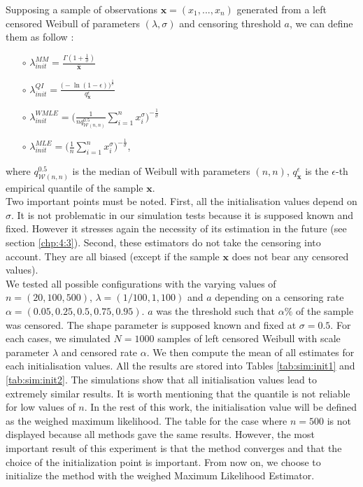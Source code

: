 \begin{appendices}
Supposing a sample of observations $\bm x = (x_1,...,x_n)$ generated from a left censored Weibull of parameters $(\lambda,\sigma)$ and censoring threshold $a$, we can define them as follow : 
    \begin{itemize}
        \item[$\circ$] $\lambda_{init}^{MM} =\frac{\Gamma(1+\frac{1}{\sigma})}{\bar{\bm x}}$ 
        \item[$\circ$] $\lambda_{init}^{QI} = \frac{\bigg(-\ln(1-\epsilon)\bigg)^{\frac{1}{\sigma}}}{q_{\bm x}^\epsilon}$
        \item[$\circ$] $\lambda_{init}^{WMLE} = \bigg(\frac{1}{nq^{0.5}_{\mathcal{W}(n,n)}}\sum_{i = 1}^nx_i^\sigma \bigg)^{-\frac{1}{\sigma}}$
        \item[$\circ$] $\lambda_{init}^{MLE} = \bigg(\frac{1}{n}\sum_{i = 1}^nx_i^\sigma \bigg)^{-\frac{1}{\sigma}}$, 
    \end{itemize}
    where $q^{0.5}_{\mathcal{W}(n,n)}$ is the median of Weibull with parameters $(n,n)$, $q_{\bm x}^\epsilon$ is the $\epsilon$-th empirical quantile of the sample $\bm x$. \\
     Two important points must be noted. First, all the initialisation values depend on $\sigma$. It is not problematic in our simulation tests because it is supposed known and fixed. However it stresses again the necessity of its estimation in the future (see section \ref{chp:4:3}). Second, these estimators do not take the censoring into account. They are all biased (except if the sample $\bm x$ does not bear any censored values). \\
     We tested all possible configurations with the varying values of $n = (20,100,500)$, $\lambda = (1/100,1,100)$ and $a$ depending on a censoring rate $\alpha = (0.05,0.25,0.5,0.75,0.95)$. $a$ was the threshold such that $\alpha \%$ of the sample was censored. The shape parameter is supposed known and fixed at $\sigma = 0.5$. For each cases, we simulated $N = 1000$ samples of left censored Weibull with scale parameter $\lambda$ and censored rate $\alpha$. We then compute the mean of all estimates for each initialisation values. All the results are stored into Tables \ref{tab:sim:init1} and \ref{tab:sim:init2}. The simulations show that all initialisation values lead to extremely similar results. It is worth mentioning that the quantile is not reliable for low values of $n$. In the rest of this work, the initialisation value will be defined as the weighed maximum likelihood. The table for the case where $n = 500$ is not displayed because all methods gave the same results. However, the most important result of this experiment is that the method converges and that the choice of the initialization point is important. From now on, we choose to initialize the method with the weighed Maximum Likelihood Estimator. 


\end{appendices}
